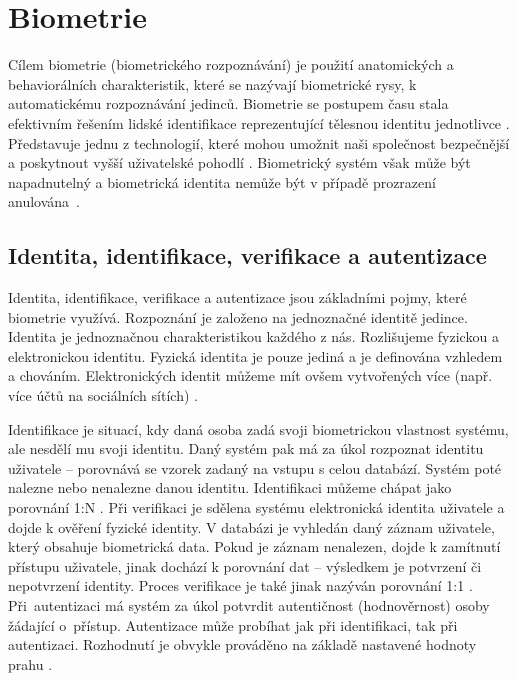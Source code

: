 \section{Biometrie}
Cílem biometrie (biometrického rozpoznávání) je použití anatomických a behaviorálních charakteristik, které se nazývají biometrické rysy, k automatickému rozpoznávání jedinců. Biometrie se postupem času stala efektivním řešením lidské identifikace reprezentující tělesnou identitu jednotlivce \cite{Maltoni2009}. Představuje jednu z technologií, které mohou umožnit naši společnost bezpečnější a poskytnout vyšší uživatelské pohodlí \cite{Maltoni2009}. Biometrický systém však může být napadnutelný a biometrická identita nemůže být v případě prozrazení anulována~\cite{BIOopora}.
\subsection{Identita, identifikace, verifikace a autentizace}
Identita, identifikace, verifikace a autentizace jsou základními pojmy, které biometrie využívá. Rozpoznání je založeno na jednoznačné identitě jedince. Identita je jednoznačnou charakteristikou každého z nás. Rozlišujeme fyzickou a elektronickou identitu. Fyzická identita je pouze jediná a je definována vzhledem a chováním. Elektronických identit můžeme mít ovšem vytvořených více (např. více účtů na sociálních sítích) \cite{BIOopora}.

Identifikace je situací, kdy daná osoba zadá svoji biometrickou vlastnost systému, ale nesdělí mu svoji identitu. Daný systém pak má za úkol rozpoznat identitu uživatele -- porovnává se vzorek zadaný na vstupu s celou databází. Systém poté nalezne nebo nenalezne danou identitu. Identifikaci můžeme chápat jako porovnání 1:N \cite{BIOopora}. Při verifikaci je sdělena systému elektronická identita uživatele a dojde k ověření fyzické identity. V databázi je vyhledán daný záznam uživatele, který obsahuje biometrická data. Pokud je záznam nenalezen, dojde k zamítnutí přístupu uživatele, jinak dochází k porovnání dat -- výsledkem je potvrzení či nepotvrzení identity. Proces verifikace je také jinak nazýván porovnání 1:1 \cite{BIOopora}. Při~autentizaci má systém za úkol potvrdit autentičnost (hodnověrnost) osoby žádající o~přístup. Autentizace může probíhat jak při identifikaci, tak při autentizaci. Rozhodnutí je obvykle prováděno na základě nastavené hodnoty prahu \cite{BIOopora}.
